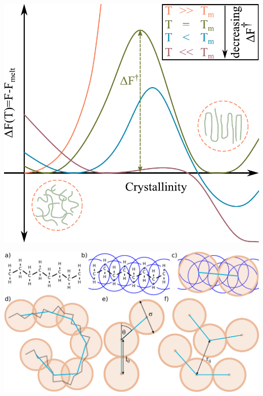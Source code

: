 \documentclass[aspectratio=169]{beamer}
\begin{document}
\begin{frame}[c]{}

  \centering
  \includegraphics[height=\textheight]{../figures/ch1_intro/fig-CNT_Free_Energy_wConfs/fig-CNT_Free_Energy_wConfs_v2.pdf}

\end{frame}

\begin{frame}[c]{}

  \centering
  \includegraphics[width=\textwidth]{../figures/ch1_intro/fig-atom_to_CG_PE/fig-atom_to_CG_PE.pdf}

\end{frame}
\end{document}
